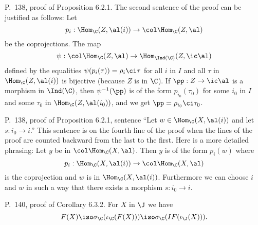 \documentclass[12pt]{article}
\theoremstyle{remark}
\theoremstyle{definition}
\begin{document}
%

\begin{s} 
P.~138, proof of Proposition 6.2.1. The second sentence of the proof can be justified as follows: Let 
$$
p_i:\Hom_\C(Z,\al(i))\to\col\Hom_\C(Z,\al)
$$ 
be the coprojections. The map 
$$
\psi:\col\Hom_\C(Z,\al)\to\Hom_{\Ind(\C)}(Z,\ic\al)
$$ 
defined by the equalities $\psi(p_i(\tau))=\rho_i\ci\tau$ for all $i$ in $I$ and all $\tau$ in $\Hom_\C(Z,\al(i))$ is bijective (because $Z$ is in $\C$). If $\pp:Z\to\ic\al$ is a morphism in $\Ind(\C)$, then $\psi^{-1}(\pp)$ is of the form $p_{i_0}(\tau_0)$ for some $i_0$ in $I$ and some $\tau_0$ in $\Hom_\C(Z,\al(i_0))$, and we get $\pp=\rho_{i_0}\ci\tau_0$. 
\end{s}

%

\begin{s} 
P.~138, proof of Proposition 6.2.1, sentence ``Let $w\in\Hom_\C(X,\al(i))$ and let $s:i_0\to i$.'' This sentence is on the fourth line of the proof when the lines of the proof are counted backward from the last to the first. Here is a more detailed phrasing: Let $y$ be in $\col\Hom_\C(X,\al)$. Then $y$ is of the form $p_i(w)$ where 
$$
p_i:\Hom_\C(X,\al(i))\to\col\Hom_\C(X,\al)
$$ 
is the coprojection and $w$ is in $\Hom_\C(X,\al(i))$. Furthermore we can choose $i$ and $w$ in such a way that there exists a morphism $s:i_0\to i$.
\end{s}

%

\begin{s} 
P.~140, proof of Corollary 6.3.2. For $X$ in $\J$ we have 
$$
F(X)\iso\sigma_\C(\iota_\C(F(X)))\iso\sigma_\C(IF(\iota_\J(X))).
$$
\end{s}

%
\end{document}
